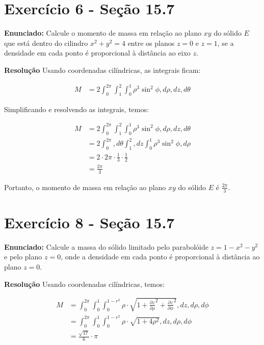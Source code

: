 \documentclass{article}
\begin{document}
\section*{Exercício 6 - Seção 15.7}
\textbf{Enunciado:} Calcule o momento de massa em relação ao plano $xy$ do sólido $E$ que está dentro do cilindro $x^2 + y^2 = 4$ entre os planos $z = 0$ e $z = 1$, se a densidade em cada ponto é proporcional à distância ao eixo $z$.

\textbf{Resolução} Usando coordenadas cilíndricas, as integrais ficam:

\begin{align*}
M &= 2\int_0^{2\pi}\int_1^2\int_0^1 \rho^3 \sin^2\phi , d\rho , dz , d\theta
\end{align*}

Simplificando e resolvendo as integrais, temos:

\begin{align*}
M &= 2\int_0^{2\pi}\int_1^2\int_0^1 \rho^3 \sin^2\phi , d\rho , dz , d\theta \\
&= 2\int_0^{2\pi} , d\theta \int_1^2 , dz \int_0^1 \rho^3 \sin^2\phi , d\rho \\
&= 2\cdot 2\pi \cdot \frac{1}{3} \cdot \frac{1}{2} \\
&= \frac{2\pi}{3}
\end{align*}

Portanto, o momento de massa em relação ao plano $xy$ do sólido $E$ é $\frac{2\pi}{3}$.

\newpage

\section*{Exercício 8 - Seção 15.7}
\textbf{Enunciado:} Calcule a massa do sólido limitado pelo parabolóide $z = 1 - x^2 - y^2$ e pelo plano $z = 0$, onde a densidade em cada ponto é proporcional à distância ao plano $z = 0$.

\textbf{Resolução} Usando coordenadas cilíndricas, temos:

\begin{align*}
M &= \int_0^{2\pi}\int_0^1\int_0^{1-r^2} \rho \cdot \sqrt{1 + \frac{\partial z}{\partial \rho}^2 + \frac{\partial z}{\partial \phi}^2} , dz , d\rho , d\phi \\
&= \int_0^{2\pi}\int_0^1\int_0^{1-r^2} \rho \cdot \sqrt{1 + 4\rho^2} , dz , d\rho , d\phi \\
&= \frac{\sqrt{17}}{6} \cdot \pi
\end{align*}
\end{document}
